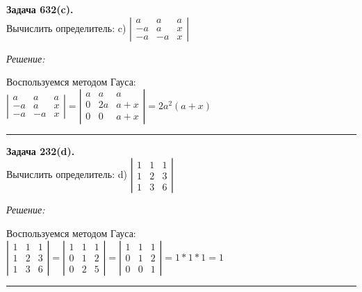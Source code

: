 \documentclass[a4paper, 12pt]{article}
\newenvironment{problem}[2][Задача]
    { \begin{mdframed}[backgroundcolor=gray!10] \textbf{#1 #2.} \\}
    {  \end{mdframed}}
\newenvironment{solution}
    {\textit{Решение: }}
    {\noindent\rule{7in}{1.5pt}}
\begin{document}
\begin{problem}{632(c)}
Вычислить определитель:
c) $\left| \begin{array}{rrr}a & a & a \\ -a & a & x\\-a & -a & x \end{array} \right|$
\end{problem}
\begin{solution}

Воспользуемся методом Гауса: \\
$
\left|
\begin{array}{rrr}
a & a & a \\
-a & a & x \\
-a & -a & x
\end{array}
\right|
=
\left|
\begin{array}{rrr}
a & a & a \\
0 & 2a & a + x \\
0 & 0 & a + x
\end{array}
\right|
=
2a^2(a + x)
$

\end{solution} 

\begin{problem}{232(d)}
Вычислить определитель:
d) $\left| \begin{array}{rrr}1 & 1 & 1 \\ 1 & 2 & 3 \\ 1 & 3 & 6 \end{array} \right|$ 
\end{problem}
\begin{solution}

Воспользуемся методом Гауса: \\
$
\left|
\begin{array}{rrr}
1 & 1 & 1 \\
1 & 2 & 3 \\
1 & 3 & 6
\end{array}
\right|
=
\left|
\begin{array}{rrr}
1 & 1 & 1 \\
0 & 1 & 2 \\
0 & 2 & 5
\end{array}
\right|
=
\left|
\begin{array}{rrr}
1 & 1 & 1 \\
0 & 1 & 2 \\
0 & 0 & 1
\end{array}
\right|
= 1 * 1 * 1 = 1
$


\end{solution} 
\end{document}

